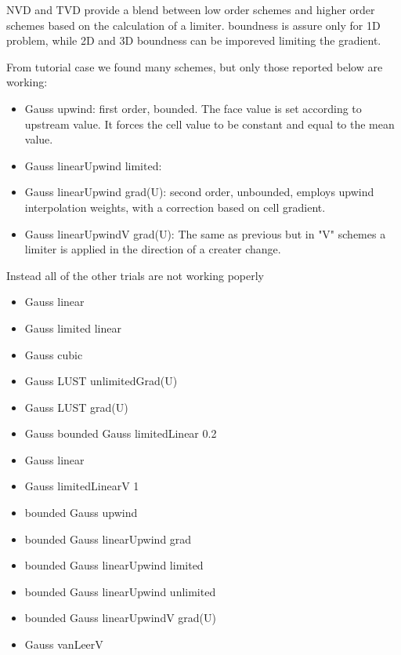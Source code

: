 \documentclass[a4paper,12pt]{article}
\begin{document}
NVD and TVD provide a blend between low order schemes and higher order schemes based on the calculation of a limiter. boundness is assure only for 1D problem, while 2D and 3D boundness can be imporeved limiting the gradient.

From tutorial case we found many schemes, but only those reported below are working:
\begin{itemize} 
\item {\ttfamily Gauss upwind}: first order, bounded. The face value is set according to upstream value. It forces the cell value to be constant and equal to the mean value.
 
 \item {\ttfamily Gauss linearUpwind limited}:
 
 \item {\ttfamily Gauss linearUpwind grad(U)}: second order, unbounded, employs upwind interpolation weights, with a correction based on cell gradient.
 
 \item {\ttfamily Gauss linearUpwindV grad(U)}: The same as previous but in "V" schemes a limiter is applied in the direction of a creater change.

\end{itemize} 
Instead all of the other trials are not working poperly
\begin{itemize} 

 \item {\ttfamily Gauss linear}
 \item {\ttfamily Gauss limited linear}
 \item {\ttfamily Gauss cubic}
 \item {\ttfamily Gauss LUST unlimitedGrad(U)}
 \item {\ttfamily Gauss LUST grad(U)}
 \item {\ttfamily Gauss bounded Gauss limitedLinear 0.2}
 \item {\ttfamily Gauss linear}
 \item {\ttfamily Gauss limitedLinearV 1}
 \item {\ttfamily bounded Gauss upwind}
 \item {\ttfamily bounded Gauss linearUpwind grad}
 \item {\ttfamily bounded Gauss linearUpwind limited}
 \item {\ttfamily bounded Gauss linearUpwind unlimited}
 \item {\ttfamily bounded Gauss linearUpwindV grad(U)}
 \item {\ttfamily Gauss vanLeerV}
\end{itemize} 
\end{document}
